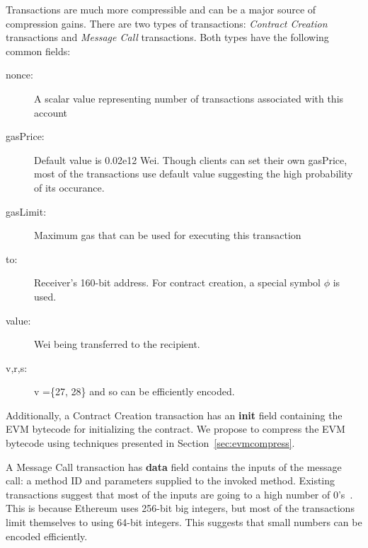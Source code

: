 Transactions are much more compressible and can be a major source of compression gains.
There are two types of transactions: {\em Contract Creation} transactions and {\em Message Call} transactions.
Both types have the following common fields:
\begin{description}
  \item[nonce:] A scalar value representing number of transactions associated with this account
  \item[gasPrice:] Default value is 0.02e12 Wei. Though clients can set their own gasPrice, most of the transactions use default value suggesting the high probability of its occurance.
  \item[gasLimit:] Maximum gas that can be used for executing this transaction
  \item[to:] Receiver's 160-bit address. For contract creation, a special symbol $\phi$ is used.
  \item[value:] Wei being transferred to the recipient.
  \item[v,r,s:] v =\{27, 28\} and so can be efficiently encoded.
\end{description}

Additionally, a Contract Creation transaction has an \textbf{init} field containing the EVM bytecode for initializing the contract.
We propose to compress the EVM bytecode using techniques presented in Section~\ref{sec:evmcompress}.

A Message Call transaction has \textbf{data} field contains the inputs of the message call: a method ID and parameters supplied to the invoked method.
Existing transactions suggest that most of the inputs are going to a high number of 0's~\cite{ethtx}. 
This is because Ethereum uses 256-bit big integers, but most of the transactions limit themselves to using 64-bit integers.
This suggests that small numbers can be encoded efficiently.


%

